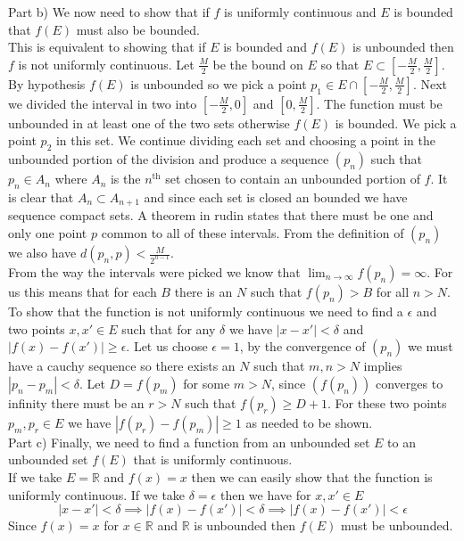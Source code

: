 \documentclass[11pt,reqno]{article}
\begin{document}
\noindent Part b) We now need to show that if $f$ is uniformly continuous and $E$ is bounded that $f(E)$ must also be bounded.\\
\indent This is equivalent to showing that if $E$ is bounded and $f(E)$ is unbounded then $f$ is not uniformly continuous. Let $\frac{M}{2}$ be the bound on $E$ so that $E \subset [-\frac{M}{2},\frac{M}{2}]$. By hypothesis $f(E)$ is unbounded so we pick a point $p_1 \in E \cap  [-\frac{M}{2},\frac{M}{2}]$. Next we divided the interval in two into $ [-\frac{M}{2},0]$ and $[0,\frac{M}{2}]$. The function must be unbounded in at least one of the two sets otherwise $f(E)$ is bounded. We pick a point $p_2$ in this set. We continue dividing each set and choosing a point in the unbounded portion of the division and produce a sequence $(p_n)$ such that $p_n \in A_n$ where $A_n$ is the $n^\text{th}$ set chosen to contain an unbounded portion of $f$. It is clear that $A_n \subset A_{n+1}$ and since each set is closed an bounded we have sequence compact sets. A theorem in rudin states that there must be one and only one point $p$ common to all of these intervals. From the definition of $(p_n)$ we also have $d(p_n,p) < \frac{M}{2^{n-1}}$.\\
\indent From the way the intervals were picked we know that $\lim_{n \to \infty} f(p_n) = \infty$. For us this means that for each $B$ there is an $N$ such that $f(p_n) > B$ for all $n > N$. To show that the function is not uniformly continuous we need to find a $\epsilon$ and two points $x,x' \in E$ such that for any $\delta$ we have $|x-x'| < \delta$ and $|f(x)-f(x')| \ge \epsilon$. Let us choose $\epsilon = 1$, by the convergence of $(p_n)$ we must have a cauchy sequence so there exists an $N$ such that $m,n > N$ implies $|p_n-p_m| < \delta$. Let $D = f(p_m)$ for some $m > N$, since $(f(p_n))$ converges to infinity there must be an $r > N$ such that $f(p_r) \ge D+1$. For these two points $p_m,p_r \in E$ we have $|f(p_r)-f(p_m)| \ge 1$ as needed to be shown.\\
 
\noindent Part c) Finally, we need to find a function from an unbounded set $E$ to an unbounded set $f(E)$ that is uniformly continuous.\\
\indent If we take $E= \mathbb{R}$ and $f(x) = x$ then we can easily show that the function is uniformly continuous. If we take $\delta = \epsilon$ then we have for $x,x' \in E$
\[ |x-x'| < \delta \implies |f(x)-f(x')| < \delta \implies |f(x)-f(x')| < \epsilon \]
Since $f(x) = x$ for $x \in \mathbb{R}$ and $\mathbb{R}$ is unbounded then $f(E)$ must be unbounded.
\end{document}
